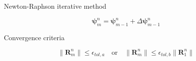 \documentclass{article}
\begin{document}
Newton-Raphson iterative method

\begin{equation}
\boldsymbol{\psi}^{n}_{m} = \boldsymbol{\psi}^{n}_{m-1} + \Delta \boldsymbol{\psi}^{n}_{m-1}
\label{eqn:solve}
\end{equation}

Convergence criteria

\begin{equation}
\lVert \mathbf{R}^n_m \rVert \leq \epsilon_{tol,a} 
\quad \text{or} \quad 
\lVert\mathbf{R}^n_m \rVert \leq \epsilon_{tol,b} \lVert \mathbf{R}^n_1 \rVert
\label{eqn:conv-criteria}
\end{equation}



\end{document}
